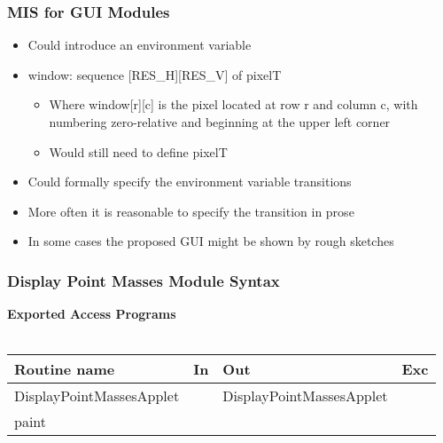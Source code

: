 \documentclass[t,12pt,numbers,fleqn,handout]{beamer}
\begin{document}

\begin{frame}
\frametitle{MIS for GUI Modules}

\begin{itemize}
\item Could introduce an environment variable
\item window: sequence [RES\_H][RES\_V] of pixelT
\begin{itemize}
\item Where window[r][c] is the pixel located at row r and column c, with numbering zero-relative and beginning at the
upper left corner
\item Would still need to define pixelT
\end{itemize}
\item Could formally specify the environment variable transitions
\item More often it is reasonable to specify the transition in prose
\item In some cases the proposed GUI might be shown by rough sketches
\end{itemize}

\end{frame}


\begin{frame}
\frametitle{Display Point Masses Module Syntax}

\textbf{Exported Access Programs}\\
~\newline
\begin{tabular}{| l | l | l | l |}
\hline
\textbf{Routine name} & \textbf{In} & \textbf{Out} & \textbf{Exc}\\
\hline
DisplayPointMassesApplet & ~ & DisplayPointMassesApplet & ~\\
\hline
paint & ~ & ~ & ~\\
\hline
\end{tabular}

\end{frame}

\end{document}
